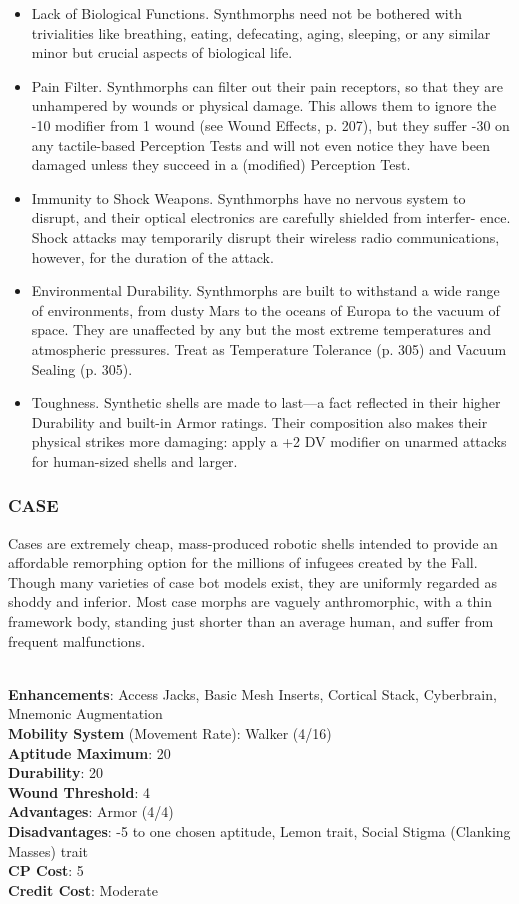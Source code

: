 \begin{itemize}
\item Lack of Biological Functions. Synthmorphs need not be bothered with
  trivialities like breathing, eating, defecating, aging, sleeping, or any
  similar minor but crucial aspects of biological life.
\item Pain Filter. Synthmorphs can filter out their pain receptors, so that
  they are unhampered by wounds or physical damage. This allows them to ignore
  the -10 modifier from 1 wound (see Wound Effects, p. 207), but they suffer
  -30 on any tactile-based Perception Tests and will not even notice they have
  been damaged unless they succeed in a (modified) Perception Test.
\item Immunity to Shock Weapons. Synthmorphs have no nervous system to disrupt,
  and their optical electronics are carefully shielded from interfer-
  ence. Shock attacks may temporarily disrupt their wireless radio
  communications, however, for the duration of the attack.
\item Environmental Durability. Synthmorphs are built to withstand a wide range
  of environments, from dusty Mars to the oceans of Europa to the vacuum of
  space. They are unaffected by any but the most extreme temperatures and
  atmospheric pressures. Treat as Temperature Tolerance (p.  305) and Vacuum
  Sealing (p. 305).
\item Toughness. Synthetic shells are made to last—a fact reflected in their
  higher Durability and built-in Armor ratings. Their composition also makes
  their physical strikes more damaging: apply a +2 DV modifier on unarmed
  attacks for human-sized shells and larger.
\end{itemize}

\subsubsection{CASE}
Cases are extremely cheap, mass-produced robotic shells intended to provide an
affordable remorphing option for the millions of infugees created by the
Fall. Though many varieties of case bot models exist, they are uniformly
regarded as shoddy and inferior. Most case morphs are vaguely anthromorphic,
with a thin framework body, standing just shorter than an average human, and
suffer from frequent malfunctions.

\\ \textbf{Enhancements}: Access Jacks, Basic Mesh Inserts, Cortical Stack, Cyberbrain, Mnemonic Augmentation
\\ \textbf{Mobility System} (Movement Rate): Walker (4/16)
\\ \textbf{Aptitude Maximum}: 20
\\ \textbf{Durability}: 20
\\ \textbf{Wound Threshold}: 4
\\ \textbf{Advantages}: Armor (4/4)
\\ \textbf{Disadvantages}: -5 to one chosen aptitude, Lemon trait, Social Stigma (Clanking Masses) trait
\\ \textbf{CP Cost}: 5
\\ \textbf{Credit Cost}: Moderate

